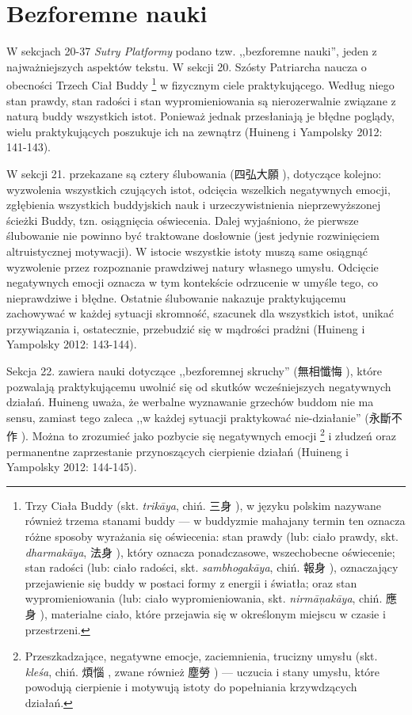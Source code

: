 \section{Bezforemne nauki}
W sekcjach 20-37 \textit{Sutry Platformy} podano tzw. ,,bezforemne nauki'', jeden z najważniejszych aspektów tekstu. W sekcji 20. Szósty Patriarcha naucza o obecności Trzech Ciał Buddy%
\footnote{Trzy Ciała Buddy (skt. \textit{trikāya}, chiń. 三身 ), w języku polskim nazywane również trzema stanami buddy --- w buddyzmie mahajany termin ten oznacza różne sposoby wyrażania się oświecenia: stan prawdy (lub: ciało prawdy, skt. \textit{dharmakāya}, 法身 ), który oznacza ponadczasowe, wszechobecne oświecenie; stan radości (lub: ciało radości, skt. \textit{sambhogakāya}, chiń. 報身 ), oznaczający przejawienie się buddy w postaci formy z energii i światła; oraz stan wypromieniowania (lub: ciało wypromieniowania, skt. \textit{nirmā\d{n}akāya}, chiń. 應身 ), materialne ciało, które przejawia się w określonym miejscu w czasie i przestrzeni.}
w fizycznym ciele praktykującego.
Według niego stan prawdy, stan radości i stan wypromieniowania są nierozerwalnie związane z naturą buddy wszystkich istot.
Ponieważ jednak przesłaniają je błędne poglądy, wielu praktykujących poszukuje ich na zewnątrz
(Huineng i Yampolsky 2012: 141-143).

W sekcji 21. przekazane są cztery ślubowania (四弘大願 ), dotyczące kolejno: wyzwolenia wszystkich czujących istot, odcięcia wszelkich negatywnych emocji, zgłębienia wszystkich buddyjskich nauk i urzeczywistnienia nieprzewyższonej ścieżki Buddy, tzn. osiągnięcia oświecenia.
Dalej wyjaśniono, że pierwsze ślubowanie nie powinno być traktowane dosłownie (jest jedynie rozwinięciem altruistycznej motywacji).
W istocie wszystkie istoty muszą same osiągnąć wyzwolenie przez rozpoznanie prawdziwej natury własnego umysłu.
Odcięcie negatywnych emocji oznacza w tym kontekście odrzucenie w umyśle tego, co nieprawdziwe i błędne.
Ostatnie ślubowanie nakazuje praktykującemu zachowywać w każdej sytuacji skromność, szacunek dla wszystkich istot, unikać przywiązania i, ostatecznie, przebudzić się w mądrości pradżni
(Huineng i Yampolsky 2012: 143-144).

Sekcja 22. zawiera nauki dotyczące ,,bezforemnej skruchy'' (無相懺悔 ), które pozwalają praktykującemu uwolnić się od skutków wcześniejszych negatywnych działań.
Huineng uważa, że werbalne wyznawanie grzechów buddom nie ma sensu, zamiast tego zaleca ,,w każdej sytuacji praktykować nie-działanie'' (永斷不作 ). Można to zrozumieć jako pozbycie się negatywnych emocji%
\footnote{Przeszkadzające, negatywne emocje, zaciemnienia, trucizny umysłu (skt. \textit{kleśa}, chiń. 煩惱 , zwane również 塵勞 ) --- uczucia i stany umysłu, które powodują cierpienie i motywują istoty do popełniania krzywdzących działań.}
i złudzeń oraz permanentne zaprzestanie przynoszących cierpienie działań
(Huineng i Yampolsky 2012: 144-145).

